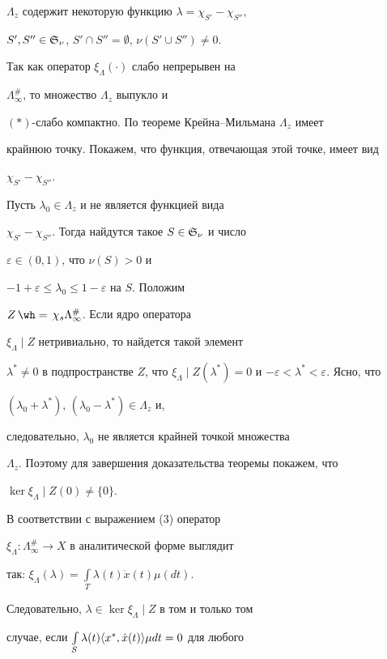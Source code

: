 $\Lambda_z$ содержит некоторую функцию $\lambda=\chi_{S'}-\chi_{S''}$, 


$S',S''\in\frak S_\nu$, $S'\cap S''=\emptyset$, $\nu(S'\cup S'')\ne0$. 


Так как оператор $\xi_\Lambda(\cdot)$ слабо непрерывен на 


$\Lambda^{\#}_\infty$, то множество $\Lambda_z$ выпукло и 


$(\ast)$-слабо компактно. По теореме Крейна--Мильмана $\Lambda_z$ имеет 


крайнюю точку. Покажем, что функция, отвечающая этой точке, имеет вид 


$\chi_{S'}-\chi_{S''}$. 


 


Пусть $\lambda_0\in\Lambda_z$ и не является функцией вида 


$\chi_{S'}-\chi_{S''}$. Тогда найдутся такое $S\in\frak S_\nu$ и число 


$\varepsilon\in(0,1)$, что $\nu(S)>0$ и 


$-1+\varepsilon\le\lambda_0\le1-\varepsilon$ на $S$. Положим 


$Z\hateq\chi_s\Lambda^{\#}_\infty$. Если ядро оператора 


$\xi_\Lambda\mid Z$ нетривиально, то найдется такой элемент 


$\lambda^*\ne0$ в подпространстве $Z$, что $\xi_\Lambda\mid 


Z(\lambda^*)=0$ и $-\varepsilon<\lambda^*<\varepsilon$. Ясно, что 


$(\lambda_0+\lambda^*),\,(\lambda_0-\lambda^*)\in\Lambda_z$ и, 


следовательно, $\lambda_0$ не является крайней точкой множества 


$\Lambda_z$. Поэтому для завершения доказательства теоремы покажем, что 


$\ker\xi_\Lambda\mid Z(0)\ne\{0\}$. 


 


В соответствии с выражением (3) оператор 


$\xi_\Lambda:\Lambda^{\#}_\infty\to X$ в аналитической форме выглядит 


так: $\xi_\Lambda(\lambda)=\int\limits_T\lambda(t)\Dot x(t)\mu(dt)$. 


Следовательно, $\lambda\in\ker\xi_\Lambda\mid Z$ в том и только том 


случае, если $\int\limits_S\lambda(t)\langle x^*,\Dot x(t)\rangle\mu dt=0$ для любого 


